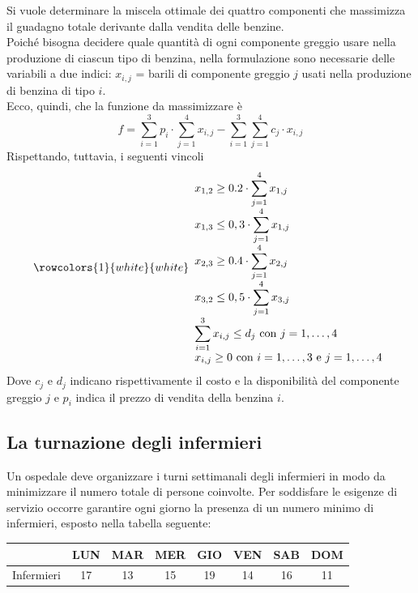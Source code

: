 \documentclass[a4paper]{extarticle}
\renewcommand\arraystretch{}
\begin{document}
\vspace{1em}
\noindent
Si vuole determinare la miscela ottimale dei quattro componenti che massimizza il guadagno totale derivante dalla vendita delle benzine.\\
Poiché bisogna decidere quale quantità di ogni componente greggio usare nella produzione di ciascun tipo di benzina, nella formulazione sono necessarie delle variabili a due indici: $x_{i,j}$ = barili di componente greggio $j$ usati nella produzione di benzina di tipo $i$.\\
Ecco, quindi, che la funzione da massimizzare è
\[f = \sum_{i=1}^{3} p_{i} \cdot \sum_{j=1}^{4} x_{i,j} - \sum_{i=1}^{3} \sum_{j=1}^{4} c_j \cdot x_{i,j} \]
Rispettando, tuttavia, i seguenti vincoli
\[\rowcolors{1}{white}{white}
\begin{array}{l}
    \displaystyle{x_{1,2} \geq 0.2 \cdot \sum_{j=1}^{4} x_{1,j}}\\
    \displaystyle{x_{1,3} \leq 0,3 \cdot \sum_{j=1}^{4} x_{1,j}}\\
    \displaystyle{x_{2,3} \geq 0.4 \cdot \sum_{j=1}^{4} x_{2,j}}\\
    \displaystyle{x_{3,2} \leq 0,5 \cdot \sum_{j=1}^{4} x_{3,j}}\\
    \displaystyle{\sum_{i=1}^{3} x_{i,j} \leq d_j \text{ con } j=1,\dots,4}\\
    \displaystyle{x_{i,j} \geq 0 \text{ con } i=1,\dots,3 \text{ e } j=1,\dots,4}
\end{array}\]
Dove $c_j$ e $d_j$ indicano rispettivamente il costo e la disponibilità del componente greggio $j$ e $p_i$ indica il prezzo di vendita della benzina $i$.

\vspace{1em}
\noindent
\subsection{La turnazione degli infermieri}
Un ospedale deve organizzare i turni settimanali degli infermieri in modo da minimizzare il numero totale di persone coinvolte. Per soddisfare le esigenze di servizio occorre garantire ogni giorno la presenza di un numero minimo di infermieri, esposto nella tabella seguente:

\begin{table}[H]
\setlength{\tabcolsep}{8pt}
\renewcommand{\arraystretch}{1.5}
\noindent
\centering
\begin{tabular}{l|c|c|c|c|c|c|c|}
     & LUN & MAR & MER & GIO & VEN & SAB & DOM\\
    \hline
    Infermieri & 17 & 13 & 15 & 19 & 14 & 16 & 11\\
    \hline
\end{tabular}
\end{table}
\end{document}
